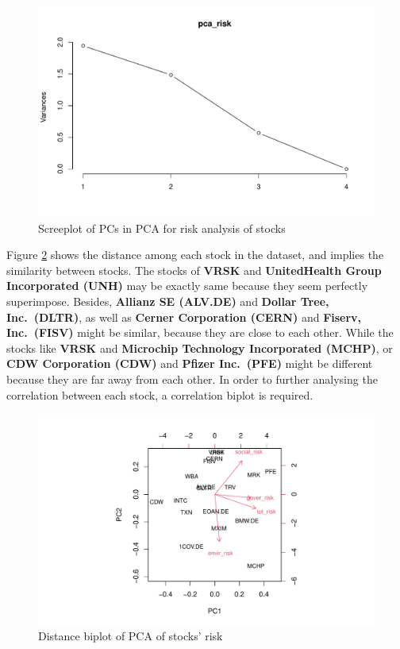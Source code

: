 \documentclass[11pt,a4paper,]{article}
\begin{document}
\begin{figure}
\centering
\includegraphics{ass2_files/figure-latex/pca-risk-screeplot-1.pdf}
\caption{\label{fig:pca-risk-screeplot}Screeplot of PCs in PCA for risk analysis of stocks}
\end{figure}

Figure \ref{fig:pca-risk-distance} shows the distance among each stock in the dataset, and implies the similarity between stocks. The stocks of \textbf{VRSK} and \textbf{UnitedHealth Group Incorporated (UNH)} may be exactly same because they seem perfectly superimpose. Besides, \textbf{Allianz SE (ALV.DE)} and \textbf{Dollar Tree, Inc.~(DLTR)}, as well as \textbf{Cerner Corporation (CERN)} and \textbf{Fiserv, Inc.~(FISV)} might be similar, because they are close to each other. While the stocks like \textbf{VRSK} and \textbf{Microchip Technology Incorporated (MCHP)}, or \textbf{CDW Corporation (CDW)} and \textbf{Pfizer Inc.~(PFE)} might be different because they are far away from each other. In order to further analysing the correlation between each stock, a correlation biplot is required.

\begin{figure}
\centering
\includegraphics{ass2_files/figure-latex/pca-risk-distance-1.pdf}
\caption{\label{fig:pca-risk-distance}Distance biplot of PCA of stocks' risk}
\end{figure}
\end{document}
